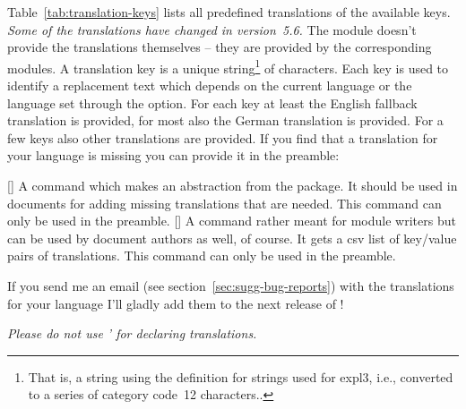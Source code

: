 \documentclass{chemmacros-manual}
\begin{document}
Table~\vref{tab:translation-keys} lists all predefined translations of the
available keys.  \emph{Some of the translations have changed in
  version~5.6.} The  module doesn't
provide the translations themselves -- they are provided by the corresponding
modules.  A translation key is a unique string\footnote{That is, a string
  using the definition for strings used for expl3, i.e., converted to a series
  of category code~12 characters..} of characters.  Each key is used to
identify a replacement text which depends on the current language or the
language set through the  option.  For each key at least the
English fallback translation is provided, for most also the German translation
is provided.  For a few keys also other translations are provided.  If you
find that a translation for your language is missing you can provide it in the
preamble:
\begin{commands}
  []
    A command which makes an abstraction from the
     package.  It should be used in documents for adding
    missing translations that are needed.  This command can only be used in
    the preamble.
  []
    A command rather meant for module writers but can be
    used by document authors as well, of course.  It gets a csv list of
    key\slash value pairs of translations.  This command can only be used in
    the preamble.
\end{commands}
If you send me an email (see section~\vref{sec:sugg-bug-reports}) with the
translations for your language I'll gladly add them to the next release of
\chemmacros!

\emph{Please do not use '  for
  declaring translations.}

\end{document}

